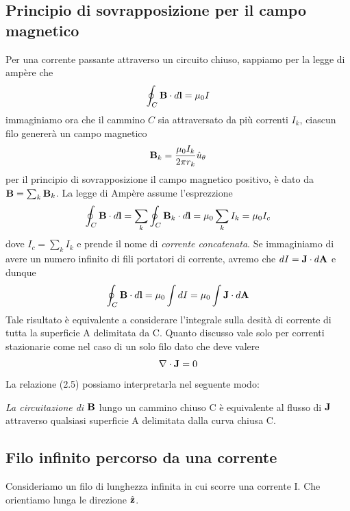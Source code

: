 \subsection{Principio di sovrapposizione per il campo magnetico}
Per una corrente passante attraverso un circuito chiuso, sappiamo per la legge di amp\`ere che 
\begin{equation*}
	\oint_{C} \bold{B} \cdot d\bold{l} = \mu_0 I
\end{equation*}
immaginiamo ora che il cammino $C$ sia attraversato da pi\`u correnti $I_k$, ciascun filo generer\`a un campo magnetico
\begin{equation*}
	\bold{B}_k =\frac{\mu_0 I_k}{2 \pi r_k}\hat{u}_{\theta}
\end{equation*}
per il principio di sovrapposizione il campo magnetico positivo, \`e dato da $\bold{B} = \sum_{k} \bold{B}_k$. La legge di Amp\`ere assume l'esprezzione
\begin{equation*}
	\oint_{C} \bold{B} \cdot d\bold{l} = \sum_{k} \oint_{C} \bold{B}_k \cdot d\bold{l} = \mu_0 \sum_{k}I_k = \mu_0 I_{c}
\end{equation*}
dove $I_c = \sum_k I_k$ e prende il nome di \textit{corrente concatenata}. Se immaginiamo di avere un numero infinito di fili portatori di corrente, avremo che $dI = \bold{J} \cdot d\bold{A}$ e dunque 
\begin{equation}
	\oint_{C} \bold{B} \cdot d \bold{l} = \mu_0 \int dI  = \mu_0 \int \bold{J} \cdot d\bold{A}
\end{equation}
Tale risultato \`e equivalente a considerare l'integrale sulla desit\`a di corrente di tutta la superficie A delimitata da C. Quanto discusso vale solo per correnti stazionarie come nel caso di un solo filo dato che deve valere 
\begin{equation*}
	\nabla \cdot \bold{J} = 0 
\end{equation*}
La relazione (2.5) possiamo interpretarla nel seguente modo:
\begin{center}
	\textit{La circuitazione di $\bold{B}$} lungo un cammino chiuso C \`e equivalente al flusso di $\bold{J}$ attraverso qualsiasi superficie A delimitata dalla curva chiusa C.
\end{center}
\subsection{Filo infinito percorso da una corrente}

Consideriamo un filo di lunghezza infinita in cui scorre una corrente I. Che orientiamo lunga le direzione $\hat{\bold{z}}$. \newpage

